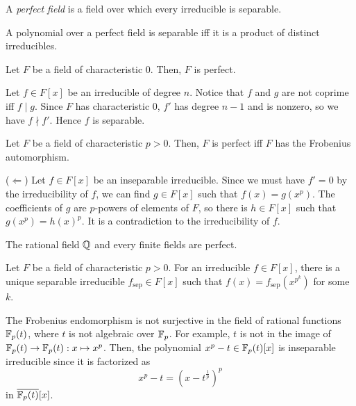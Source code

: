 \documentclass{../exp}
\newcommand{\sep}{\mathrm{sep}}
\begin{document}
\begin{defn}
A \emph{perfect field} is a field over which every irreducible is separable.
\end{defn}
\begin{cor}
A polynomial over a perfect field is separable iff it is a product of distinct irreducibles.
\end{cor}

\begin{prop}
Let $F$ be a field of characteristic $0$.
Then, $F$ is perfect.
\end{prop}
\begin{pf}
Let $f\in F[x]$ be an irreducible of degree $n$.
Notice that $f$ and $g$ are not coprime iff $f\mid g$.
Since $F$ has characteristic 0, $f'$ has degree $n-1$ and is nonzero, so we have $f\nmid f'$.
Hence $f$ is separable.
\end{pf}

\begin{prop}
Let $F$ be a field of characteristic $p>0$.
Then, $F$ is perfect iff $F$ has the Frobenius automorphism.
\end{prop}
\begin{pf}
($\Leftarrow$)
Let $f\in F[x]$ be an inseparable irreducible.
Since we must have $f'=0$ by the irreducibility of $f$, we can find $g\in F[x]$ such that $f(x)=g(x^p)$.
The coefficients of $g$ are $p$-powers of elements of $F$, so there is $h\in F[x]$ such that $g(x^p)=h(x)^p$.
It is a contradiction to the irreducibility of $f$.
\end{pf}

\begin{cor}
The rational field $\mathbb{Q}$ and every finite fields are perfect.
\end{cor}
\begin{prop}
Let $F$ be a field of characteristic $p>0$.
For an irreducible $f\in F[x]$, there is a unique separable irreducible $f_\sep\in F[x]$ such that $f(x)=f_\sep(x^{p^k})$ for some $k$.
\end{prop}

\begin{ex}
The Frobenius endomorphism is not surjective in the field of rational functions $\mathbb{F}_p(t)$, where $t$ is not algebraic over $\mathbb{F}_p$.
For example, $t$ is not in the image of $\F_p(t)\to\F_p(t):x\mapsto x^p$.
Then, the polynomial $x^p-t\in\mathbb{F}_p(t)[x]$ is inseparable irreducible since it is factorized as
\[x^p-t=(x-t^{\frac1p})^p\]
in $\overline{\mathbb{F}_p(t)}[x]$.
\end{ex}
\end{document}
